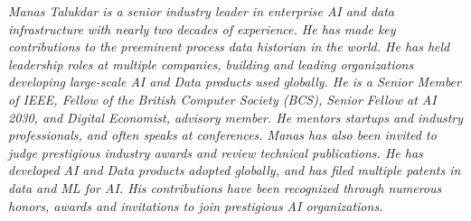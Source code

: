 {\selectfont
	\begin{justify}\textit{Manas Talukdar is a senior industry leader in enterprise AI and data infrastructure with nearly two decades of experience. He has made key contributions to the preeminent process data historian in the world. He has held leadership roles at multiple companies, building and leading organizations developing large-scale AI and Data products used globally. He is a Senior Member of IEEE, Fellow of the British Computer Society (BCS), Senior Fellow at AI 2030, and Digital Economist, advisory member. He mentors startups and industry professionals, and often speaks at conferences. Manas has also been invited to judge prestigious industry awards and review technical publications. He has developed AI and Data products adopted globally, and has filed multiple patents in data and ML for AI. His contributions have been recognized through numerous honors, awards and invitations to join prestigious AI organizations.}\end{justify}
}
\vspace{-12pt}